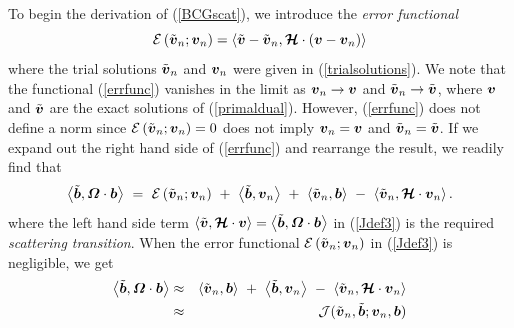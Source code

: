 To begin the derivation of (\ref{BCGscat}),
we introduce the {\em error functional\/}
\begin{equation} \label{errfunc}
	{\cal E}\left(\tilde{\bmi  v}{}_{n};{\bmi  
	v}{}_{n}\right)=\left\langle{\tilde{\bmi  v}-\tilde{\bmi  v}_{n}, 
	{\CB H} \cdot \left( {\bmi  v}-{\bmi  v}_{n} \right)}\right\rangle 
\end{equation}
where the trial solutions $\tilde{\bmi  v}{}_{n}$ and ${\bmi  v}_{n}$
were given in (\ref{trialsolutions}). We note that the functional 
(\ref{errfunc})
vanishes in the limit as ${\bmi  v}_n \rightarrow {\bmi  v}$ and
$\tilde{\bmi  v}_n \rightarrow \tilde{\bmi  v}$, where ${\bmi  v}$ and 
$\tilde{\bmi  v}$
are the exact solutions of (\ref{primaldual}). However, (\ref{errfunc}) 
does 
not define a norm since ${\cal E}\left(\tilde{\bmi  v}{}_{n};{\bmi  
	v}{}_{n}\right)=0$ does not imply  ${\bmi  v}_n={\bmi  v}$ and
$\tilde{\bmi  v}_n=\tilde{\bmi  v}$.
If we expand out the right hand side of (\ref{errfunc}) and rearrange the 
result, we readily 
find that
\begin{equation} \label{Jdef3}
	\left\langle{\tilde{\bmi  b}, {\bmi  \Omega} \cdot 
	{\bmi  b}}\right\rangle \ =\ {\cal E}\left(\tilde{\bmi  v}{}_{n};{\bmi  
	v}{}_{n}\right) \ +\  \left\langle\tilde{\bmi  b},{\bmi  
v}_{n}\right\rangle
\ +\   \left\langle\tilde{\bmi  v}{}_{n},{\bmi  b}\right\rangle
\ - \ \left\langle\tilde{\bmi  v}{}_{n},{\CB H} \cdot
{\bmi  v}_{n}\right\rangle .
\end{equation}
where the left hand side  term $\left\langle{\tilde{\bmi  v}, {\CB H} 
\cdot 
	{\bmi  v}}\right\rangle=
	\left\langle{\tilde{\bmi  b}, {\bmi  \Omega} 
\cdot 
	{\bmi  b}}\right\rangle$ in (\ref{Jdef3})  is the required {\em 
scattering 
	transition}. 
When the error functional ${\cal E}\left(\tilde{\bmi  v}{}_{n};{\bmi  
	v}{}_{n}\right)$ in (\ref{Jdef3}) is negligible, we get
\begin{eqnarray} \label{Jdef4}
	\left\langle{\tilde{\bmi  b}, {\bmi  \Omega} \cdot 
	{\bmi  b}}\right\rangle &\approx &   \left\langle\tilde{\bmi  
v}{}_{n},{\bmi  
b}\right\rangle
\ + \ \left\langle\tilde{\bmi  b},{\bmi  v}{}_{n}\right\rangle
\ - \ \left\langle\tilde{\bmi  v}{}_{n},{\CB H} \cdot
{\bmi  v}_{n}\right\rangle\nonumber\\
&\approx& {\cal J}(\tilde{\bmi  v}_n,\tilde{\bmi  b};{\bmi  v}_n, {\bmi  
b})
\end{eqnarray}

